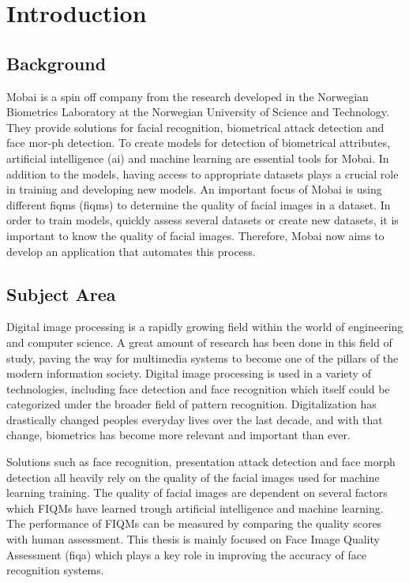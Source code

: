 \chapter{Introduction}
\label{chap:Intro}

\section{Background}
\label{section:background}
Mobai is a spin off company from the research developed in the Norwegian Biometrics Laboratory at the Norwegian University of Science and Technology. They provide solutions for facial recognition, biometrical attack detection and face mor-ph detection. To create models for detection of biometrical attributes, artificial intelligence (\acrshort{ai}) and machine learning are essential tools for Mobai. In addition to the models, having access to appropriate datasets plays a crucial role in training and developing new models. An important focus of Mobai is using different \acrlong{fiqm}s (\acrshort{fiqm}s) to determine the quality of facial images in a dataset. In order to train models, quickly assess several datasets or create new datasets, it is important to know the quality of facial images. Therefore, Mobai now aims to develop an application that automates this process. 

\section{Subject Area}
Digital image processing is a rapidly growing field within the world of engineering and computer science. A great amount of research has been done in this field of study, paving the way for multimedia systems to become one of the pillars of the modern information society. Digital image processing is used in a variety of technologies, including face detection and face recognition which itself could be categorized under the broader field of pattern recognition. Digitalization has drastically changed peoples everyday lives over the last decade, and with that change, biometrics has become more relevant and important than ever. 

Solutions such as face recognition, presentation attack detection and face morph detection all heavily rely on the quality of the facial images used for machine learning training. The quality of facial images are dependent on several factors which FIQMs have learned trough artificial intelligence and machine learning. The performance of FIQMs can be measured by comparing the quality scores with human assessment. This thesis is mainly focused on Face Image Quality Assessment (\acrshort{fiqa}) which plays a key role in improving the accuracy of face recognition systems. 

